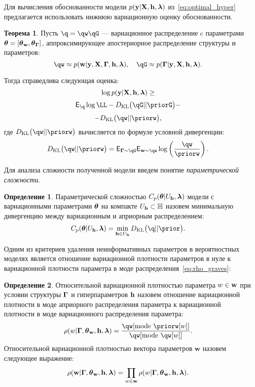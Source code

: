 \documentclass[11pt, a5paper]{dissert}
\theoremstyle{definition}
\newtheorem{theorem}{Теорема}
\newtheorem{defin}{Определение}
\begin{document}
{Для вычисления обоснованности модели $p(\mathbf{y}|\mathbf{X}, \mathbf{h},\boldsymbol{\lambda})$ из~\eqref{eq:optimal_hyper} предлагается использовать нижнюю вариационную оценку обоснованности.

\begin{theorem}
Пусть $\q = \qw \qG$ --- вариационное распределение c параметрами $\boldsymbol{\theta}= [\boldsymbol{\theta}_\mathbf{w}, \boldsymbol{\theta}_{\boldsymbol{\Gamma}} ]$, аппроксимирующее апостериорное распределение структуры и параметров:
\[
   \qw  \approx \postw, \quad    \qG \approx \postG.
\]

Тогда справедлива следующая оценка:
\begin{equation}
\label{eq:full_elbo}
\log p(\mathbf{y}|\mathbf{X}, \mathbf{h},\boldsymbol{\lambda}) \geq
\end{equation}
\[
 \E_{\q}  \log \LL - \KL{\qG}{\priorG} - 
\]
\[
 - \KL{\qw}{\priorw},
\]
где $\KL{\qw}{\priorw}$ вычисляется по формуле условной дивергенции:
\[
\KL{\qw}{\priorw} = \E_{\G \sim \qG} \E_{\w \sim \qw} \log \left(\frac{\qw}{\priorw}\right).
\]
\end{theorem}


Для анализа сложности полученной модели введем понятие \textit{параметрической сложности}. 
\begin{defin} 
Параметрической сложностью  $C_p(\boldsymbol{\theta}|U_{\mathbf{h}}, \boldsymbol{\lambda})$ модели с вариационными параметрами $\boldsymbol{\theta}$ на компакте $U_{\mathbf{h}} \subset \mathbb{H}$ назовем минимальную дивергенцию между вариационным и априорным распределением:
\[
C_p(\teta|\Uh, \lam) = \min_{\h \in \Uh} \KL{\q}{\prior}.
\]
\end{defin}

Одним из критериев удаления неинформативных параметров в вероятностных моделях является отношение вариационной плотности параметров в нуле к вариационной плотности параметра в моде распределения~\eqref{eq:rho_graves}:
\begin{defin}
Относительной вариационной   плотностью параметра $w \in \mathbf{w}$  при условии структуры $\boldsymbol{\Gamma}$ и гиперпараметров $\mathbf{h}$ назовем отношение вариационной плотности в моде априорного распределения параметра к вариационной плотности в моде вариационного распределения параметра:
\[
\rho(w|\G,\tetaw, \h,\lam)=\frac{\qw[\text{mode}~\priorw[w]]}{\qw[\text{mode}~{\qw[w]}]}.
\]
Относительной вариационной плотностью вектора параметров $\mathbf{w}$ назовем следующее выражение:
\begin{equation}
\label{eq:rho_general}
    {\rho}(\mathbf{w}|\boldsymbol{\Gamma}, \boldsymbol{\theta}_\mathbf{w}, \mathbf{h},\boldsymbol{\lambda}) = \prod_{w \in \mathbf{w}}\rho(w|\boldsymbol{\Gamma},\boldsymbol{\theta}_\mathbf{w},\mathbf{h},\boldsymbol{\lambda}).
\end{equation}

\end{defin}

}
\end{document}
